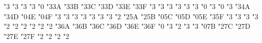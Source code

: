 \mathchardef \preccurlyeq   "3
\mathchardef \leqq   "3
\mathchardef \leqslant   "3
\mathchardef \lessgtr   "3
\mathchardef \backprime   "0
\mathchardef \risingdotseq   "3\amsafam 3A
\mathchardef \fallingdotseq   "3\amsafam 3B
\mathchardef \succcurlyeq   "3\amsafam 3C
\mathchardef \geqq   "3\amsafam 3D
\mathchardef \geqslant   "3\amsafam 3E
\mathchardef \gtrless   "3\amsafam 3F
\mathchardef \sqsubset   "3
\mathchardef \sqsupset   "3
\mathchardef \vartriangleright   "3
\mathchardef \vartriangleleft   "3
\mathchardef \trianglerighteq   "3
\mathchardef \trianglelefteq   "3
\mathchardef \bigstar   "0
\mathchardef \between   "3
\mathchardef \blacktriangledown   "0
\mathchardef \blacktriangleright   "3
\mathchardef \blacktriangleleft   "3\amsafam 4A
\mathchardef \vartriangle   "3\amsafam 4D
\mathchardef \blacktriangle   "0\amsafam 4E
\mathchardef \triangledown   "0\amsafam 4F
\mathchardef \eqcirc   "3
\mathchardef \lesseqgtr   "3
\mathchardef \gtreqless   "3
\mathchardef \lesseqqgtr   "3
\mathchardef \gtreqqless   "3
\mathchardef \Rrightarrow   "3
\mathchardef \Lleftarrow   "3
\mathchardef \veebar   "2
\mathchardef \barwedge   "2\amsafam 5A
\mathchardef \doublebarwedge   "2\amsafam 5B
\mathchardef \angle   "0\amsafam 5C
\mathchardef \measuredangle   "0\amsafam 5D
\mathchardef \sphericalangle   "0\amsafam 5E
\mathchardef \varpropto   "3\amsafam 5F
\mathchardef \smallsmile   "3
\mathchardef \smallfrown   "3
\mathchardef \Subset   "3
\mathchardef \Supset   "3
\mathchardef \Cup   "2
\mathchardef \Cap   "2
\mathchardef \curlywedge   "2
\mathchardef \curlyvee   "2
\mathchardef \leftthreetimes   "2
\mathchardef \rightthreetimes   "2
\mathchardef \subseteqq   "3\amsafam 6A
\mathchardef \supseteqq   "3\amsafam 6B
\mathchardef \bumpeq   "3\amsafam 6C
\mathchardef \Bumpeq   "3\amsafam 6D
\mathchardef \lll   "3\amsafam 6E
\mathchardef \ggg   "3\amsafam 6F
\def \ulcorner {\delimiter"4\amsafam 70\amsafam 70 }
\def \urcorner {\delimiter"5\amsafam 71\amsafam 71 }
\mathchardef \circledS   "0
\mathchardef \pitchfork   "3
\mathchardef \dotplus   "2
\mathchardef \backsim   "3
\mathchardef \backsimeq   "3
\def \llcorner {\delimiter"4\amsafam 78\amsafam 78 }
\def \lrcorner {\delimiter"5\amsafam 79\amsafam 79 }
\mathchardef \complement   "0\amsafam 7B
\mathchardef \intercal   "2\amsafam 7C
\mathchardef \circledcirc   "2\amsafam 7D
\mathchardef \circledast   "2\amsafam 7E
\mathchardef \circleddash   "2\amsafam 7F
\mathchardef \rhd   "2
\mathchardef \lhd   "2
\mathchardef \unrhd   "2
\mathchardef \unlhd   "2

